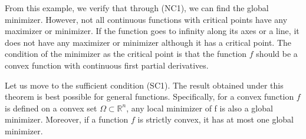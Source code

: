 \par From this example, we verify that through (NC1), we can find the global minimizer. However, not all continuous functions with critical points have any maximizer or minimizer. If the function goes to infinity along its axes or a line, it does not have any maximizer or minimizer although it has a critical point. The condition of the minimizer as the critical point is that the function $f$ should be a convex function with continuous first partial derivatives.
\par Let us move to the sufficient condition (SC1). The result obtained under this theorem is best possible for general functions. Specifically, for a convex function $f$ is defined on a convex set $\Omega \subset \mathbb{R}^n$, any local minimizer of f is also a global minimizer. Moreover, if a function $f$ is strictly convex, it has at most one global minimizer. 

